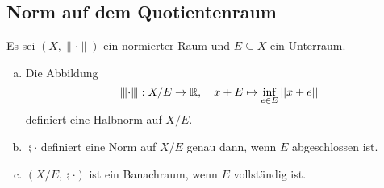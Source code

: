 \documentclass[FunkAnaskriptSS2017.tex]{subfiles}
\begin{document}
\subsection{Norm auf dem Quotientenraum}
\label{B4.1}
Es sei $(X, \|\cdot \|)$ ein normierter Raum und $E\subseteq X$ ein Unterraum.
\begin{beh}
	\begin{enumerate}[(a)]
	\item 	Die Abbildung
	$$ \interleave{\cdot}\interleave : X/E \to \mathbb{R},\quad x+E \mapsto \inf_{e\in E} \left\lvert \left\lvert x+e \right\rvert \right\rvert$$
	definiert eine Halbnorm auf $X/E$.
	
	\item 	$\semi{\cdot}$ definiert eine Norm auf $X/E$ genau dann, wenn $E$ abgeschlossen ist. 	
	
	\item $(X/E, \semi{\cdot})$ ist ein Banachraum, wenn $E$ vollständig ist.
	
	\end{enumerate}
\end{beh}
\end{document}
